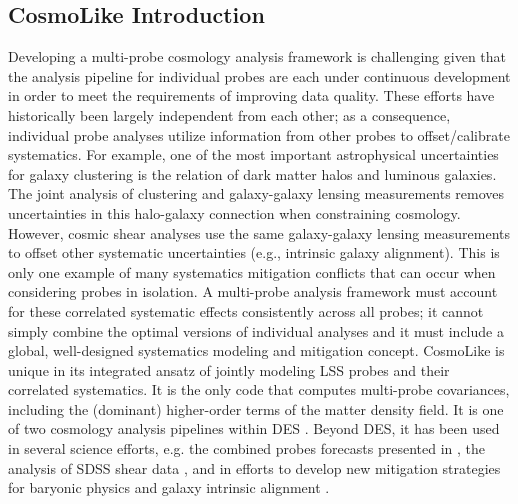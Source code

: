 \subsection{CosmoLike Introduction}
\label{sec:cosmolike}
Developing a multi-probe cosmology analysis framework is challenging given that the analysis pipeline for individual probes are each under continuous development in order to meet the requirements of improving data quality. These efforts have historically been largely independent from each other; as a consequence, individual probe analyses utilize information from other probes to offset/calibrate systematics. 
For example, one of the most important astrophysical uncertainties for galaxy clustering is the relation of dark matter halos and luminous galaxies. The joint analysis of clustering and galaxy-galaxy lensing measurements removes uncertainties in this halo-galaxy connection when constraining cosmology. However, cosmic shear analyses use the same galaxy-galaxy lensing measurements to offset other systematic uncertainties (e.g., intrinsic galaxy alignment). This is only one example of many systematics mitigation conflicts that can occur when considering probes in isolation.
A multi-probe analysis framework must account for these correlated systematic effects consistently across all probes; it cannot simply combine the optimal versions of individual analyses and it must include a global, well-designed systematics modeling and mitigation concept.
CosmoLike is unique in its integrated ansatz of jointly modeling LSS probes and their correlated systematics. It is the only code that computes multi-probe covariances, including the (dominant) higher-order terms of the matter density field. It is one of two cosmology analysis pipelines within DES \citep{The DES Collaboration 2016}. Beyond DES, it has been used in several science efforts, e.g. the combined probes forecasts presented in \citep{Eifler2014}, the analysis of SDSS shear data \citep{Huff2014}, and in efforts to develop new mitigation strategies for baryonic physics \citep{Eifler2015} and galaxy intrinsic alignment \citep{Krause2016}. 



